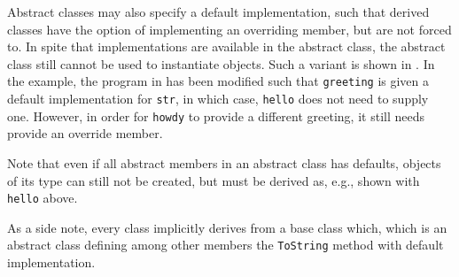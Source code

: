 Abstract classes may also specify a default implementation, such that derived classes have the option of implementing an overriding member, but are not forced to. In spite that implementations are available in the abstract class, the abstract class still cannot be used to instantiate objects. Such a variant is shown in .
%
%
%
In the example, the program in  has been modified such that \lstinline{greeting} is given a default implementation for \lstinline{str}, in which case, \lstinline{hello} does not need to supply one. However, in order for \lstinline{howdy} to provide a different greeting, it still needs provide an override member. 

Note that even if all abstract members in an abstract class has defaults, objects of its type can still not be created, but must be derived as, e.g., shown with \lstinline{hello} above.

As a side note, every class implicitly derives from a base class  which, which is an abstract class defining among other members the \lstinline{ToString} method with default implementation.

